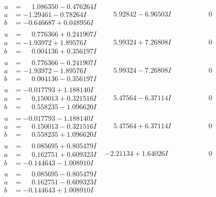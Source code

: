 \documentclass[1p]{elsarticle_modified}
\theoremstyle{definition}
\begin{document}
$$\begin{array}{c|c|c}
\begin{aligned}
u &= \phantom{-}1.086350 - 0.476264 I \\
a &= -1.29461 - 0.78264 I \\
b &= -0.646687 + 0.048956 I\end{aligned}
 & \phantom{-}5.92842 - 6.96503 I & \phantom{-0.000000 } 0 \\ \hline\begin{aligned}
u &= \phantom{-}0.776366 + 0.241907 I \\
a &= -1.93972 + 1.89576 I \\
b &= \phantom{-}0.004136 + 0.356197 I\end{aligned}
 & \phantom{-}5.99324 + 7.26808 I & \phantom{-0.000000 } 0 \\ \hline\begin{aligned}
u &= \phantom{-}0.776366 - 0.241907 I \\
a &= -1.93972 - 1.89576 I \\
b &= \phantom{-}0.004136 - 0.356197 I\end{aligned}
 & \phantom{-}5.99324 - 7.26808 I & \phantom{-0.000000 } 0 \\ \hline\begin{aligned}
u &= -0.017793 + 1.188140 I \\
a &= \phantom{-}0.150013 + 0.321516 I \\
b &= \phantom{-}0.558235 - 1.096620 I\end{aligned}
 & \phantom{-}5.47564 - 6.37114 I & \phantom{-0.000000 } 0 \\ \hline\begin{aligned}
u &= -0.017793 - 1.188140 I \\
a &= \phantom{-}0.150013 - 0.321516 I \\
b &= \phantom{-}0.558235 + 1.096620 I\end{aligned}
 & \phantom{-}5.47564 + 6.37114 I & \phantom{-0.000000 } 0 \\ \hline\begin{aligned}
u &= \phantom{-}0.085695 + 0.805479 I \\
a &= \phantom{-}0.162751 + 0.609323 I \\
b &= -0.144643 - 1.008910 I\end{aligned}
 & -2.21134 + 1.64026 I & \phantom{-0.000000 } 0 \\ \hline\begin{aligned}
u &= \phantom{-}0.085695 - 0.805479 I \\
a &= \phantom{-}0.162751 - 0.609323 I \\
b &= -0.144643 + 1.008910 I\end{aligned}

\end{array}$$
\end{document}
